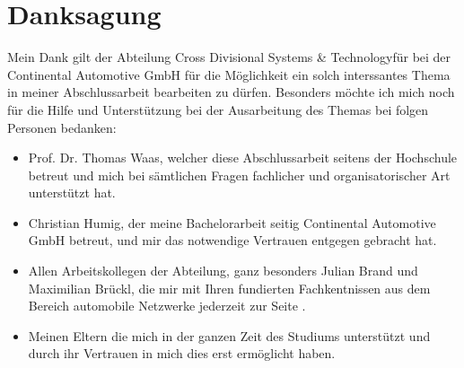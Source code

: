 \def\danksag{Danksagung}

\chapter*{\danksag}
Mein Dank gilt der Abteilung Cross Divisional Systems \& Technology\add{ }für bei der Continental Automotive GmbH für die Möglichkeit ein solch interssantes Thema in meiner Abschlussarbeit bearbeiten zu dürfen.
Besonders möchte ich mich noch für die Hilfe und Unterstützung bei der Ausarbeitung des Themas bei folgen Personen bedanken:
\begin{itemize}
	\item Prof. Dr. Thomas Waas, welcher diese Abschlussarbeit seitens der Hochschule betreut und mich bei sämtlichen Fragen fachlicher und organisatorischer Art	unterstützt hat.
	\item Christian Humig, der meine Bachelorarbeit seitig Continental Automotive
	GmbH betreut, und mir das notwendige Vertrauen entgegen gebracht hat. 
	\item Allen Arbeitskollegen der Abteilung, ganz besonders Julian Brand und Maximilian Brückl, die mir mit Ihren fundierten Fachkentnissen aus dem Bereich automobile Netzwerke jederzeit zur Seite .
	\item Meinen Eltern die mich in der ganzen Zeit des Studiums unterstützt und durch ihr Vertrauen in mich dies erst ermöglicht haben.
\end{itemize}